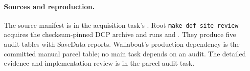 \paragraph{Sources and reproduction.}
The source manifest is in the acquisition task's
.
Root \texttt{make dof-site-review} acquires the checksum-pinned DCP archive
and runs  and
. They produce five audit tables with
SaveData reports. Wallabout's production dependency is the committed manual
parcel table; no main task depends on an audit. The detailed evidence and
implementation review is  in the
parcel audit task.

